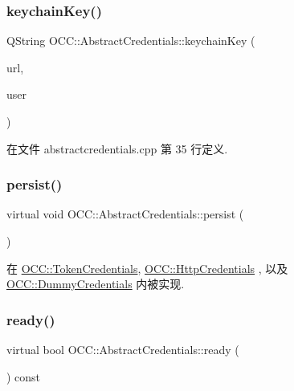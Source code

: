 \subsubsection{\texorpdfstring{keychain\+Key()}{keychainKey()}}
{\footnotesize\ttfamily Q\+String O\+C\+C\+::\+Abstract\+Credentials\+::keychain\+Key (\begin{DoxyParamCaption}\item[{const Q\+String \&}]{url,  }\item[{const Q\+String \&}]{user }\end{DoxyParamCaption})\hspace{0.3cm}{\ttfamily [static]}}



在文件 abstractcredentials.\+cpp 第 35 行定义.

\mbox{\label{class_o_c_c_1_1_abstract_credentials_ab4af03be7d9e7e330345b8f13e67a544}} 
\subsubsection{\texorpdfstring{persist()}{persist()}}
{\footnotesize\ttfamily virtual void O\+C\+C\+::\+Abstract\+Credentials\+::persist (\begin{DoxyParamCaption}{ }\end{DoxyParamCaption})\hspace{0.3cm}{\ttfamily [pure virtual]}}



在 \hyperlink{class_o_c_c_1_1_token_credentials_a3a158c2e76d58356c976ca410a7e64c1}{O\+C\+C\+::\+Token\+Credentials}, \hyperlink{class_o_c_c_1_1_http_credentials_a643967b90af32f27a6d076608ef7dccc}{O\+C\+C\+::\+Http\+Credentials} , 以及 \hyperlink{class_o_c_c_1_1_dummy_credentials_a6a0144c1c4d2db8ac9314d3c202ca643}{O\+C\+C\+::\+Dummy\+Credentials} 内被实现.

\mbox{\label{class_o_c_c_1_1_abstract_credentials_a77adad4957e0365be40db7fe4499a86b}} 
\subsubsection{\texorpdfstring{ready()}{ready()}}
{\footnotesize\ttfamily virtual bool O\+C\+C\+::\+Abstract\+Credentials\+::ready (\begin{DoxyParamCaption}{ }\end{DoxyParamCaption}) const\hspace{0.3cm}{\ttfamily [pure virtual]}}



